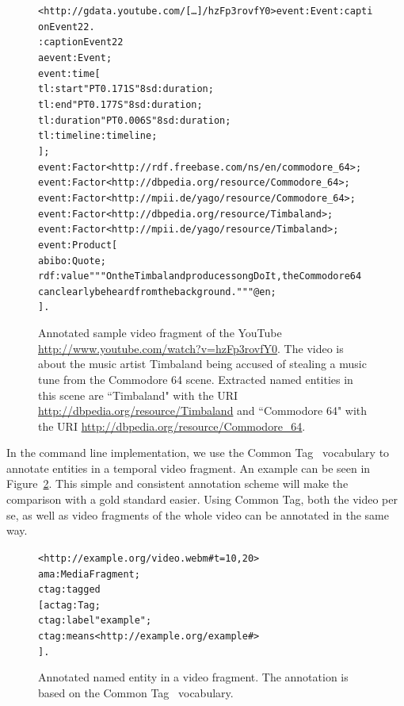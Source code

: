 \documentclass[12pt]{article}
\newenvironment{code}[1]
{\begin{lrbox}{\inverbatim}\begin{minipage}{13.5cm}\begin{alltt}{#1}}
{\end{alltt}\end{minipage}\end{lrbox}\colorbox{lightgray}{\usebox{\inverbatim}}}
\begin{document}
\begin{figure}[htbp!]
\begin{center}
{\footnotesize
\begin{code} 
<http://gdata.youtube.com/[\ldots]/hzFp3rovfY0> event:Event :captionEvent22.
:captionEvent22
  a event:Event;
  event:time [
    tl:start "PT0.171S"^^xsd:duration;
    tl:end "PT0.177S"^^xsd:duration;
    tl:duration "PT0.006S"^^xsd:duration;
    tl:timeline :timeline;
    ];
  event:Factor <http://rdf.freebase.com/ns/en/commodore\_64>;
  event:Factor <http://dbpedia.org/resource/Commodore\_64>;
  event:Factor <http://mpii.de/yago/resource/Commodore\_64>;
  event:Factor <http://dbpedia.org/resource/Timbaland>;
  event:Factor <http://mpii.de/yago/resource/Timbaland>;
  event:Product [
    a bibo:Quote;
    rdf:value """On the Timbaland produces song Do It, the Commodore 64
                 can clearly be heard from the background."""@en;
    ].
\end{code}}
  \caption[Annotated sample video fragment.]{Annotated sample video fragment of the YouTube \url{http://www.youtube.com/watch?v=hzFp3rovfY0}. The video is about the music artist Timbaland being accused of stealing a music tune from the Commodore 64 scene. Extracted named entities in this scene are ``Timbaland" with the URI \url{http://dbpedia.org/resource/Timbaland} and ``Commodore 64" with the URI \url{http://dbpedia.org/resource/Commodore_64}.}
  \label{code:c64} 
  \end{center}  
\end{figure}

In the command line implementation, we use the Common Tag~\cite{CommonTag:Spec} vocabulary to annotate entities in a temporal video fragment. An example can be seen in Figure~\ref{code:ctag}. This simple and consistent annotation scheme will make the comparison with a gold standard easier. Using Common Tag, both the video per se, as well as video fragments of the whole video can be annotated in the same way.

\begin{figure}[htbp!]
\begin{center}
{\footnotesize
\begin{code}
<http://example.org/video.webm#t=10,20>
  a ma:MediaFragment ;
  ctag:tagged
    [ a ctag:Tag ;
      ctag:label "example" ;
      ctag:means <http://example.org/example#>
    ] .
\end{code}}
  \caption[Annotated named entity in a video fragment.]{Annotated named entity in a video fragment. The annotation is based on the Common Tag~\cite{CommonTag:Spec} vocabulary.}
  \label{code:ctag} 
  \end{center}  
\end{figure}
\end{document}
